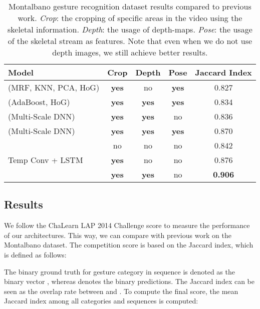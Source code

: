 \documentclass[11pt,a4paper]{article} \usepackage{a4wide}
\begin{document}
\begin{table}[bt]
\begin{center}
\begin{tabular}{lcccc}
\toprule
\multicolumn{1}{l}{\bf Model} &\multicolumn{1}{c}{\bf Crop} &\multicolumn{1}{c}{\bf Depth} &\multicolumn{1}{c}{\bf Pose} &\multicolumn{1}{c}{\bf Jaccard Index} \\ 
\midrule
\cite{chang2014nonparametric} (MRF, KNN, PCA, HoG) &\textbf{yes} &no &\textbf{yes} 	&0.827 \\
\cite{monnier2014multi} (AdaBoost, HoG) &\textbf{yes} &\textbf{yes} &\textbf{yes} 	&0.834 \\
\cite{neverova2014moddrop} (Multi-Scale DNN)  &\textbf{yes} &\textbf{yes} &no 	&0.836 \\
\cite{neverova2014moddrop} (Multi-Scale DNN)  &\textbf{yes} &\textbf{yes} &\textbf{yes} 	&0.870 \\
\midrule 
 										&no &no &no 	&0.842 \\
Temp Conv + LSTM 										&\textbf{yes} &no &no 	&0.876 \\
  										&\textbf{yes} &\textbf{yes} &no 	&\textbf{0.906} \\	
\bottomrule
\end{tabular}
\end{center}
\caption{Montalbano gesture recognition dataset results compared to previous work. \emph{Crop}: the cropping of specific areas in the video using the skeletal information. \emph{Depth}: the usage of depth-maps. \emph{Pose}: the usage of the skeletal stream as features. 
Note that even when we do not use depth images, we still achieve better results.\\}
\label{tab:sota}
\end{table}



\subsection{Results} \label{sec:results}

We follow the ChaLearn LAP 2014 Challenge score to measure the performance of our architectures. This way, we can compare with previous work on the Montalbano dataset. The competition score is based on the Jaccard index, which is defined as follows:

The binary ground truth for gesture category  in sequence  is denoted as the binary vector , whereas  denotes the binary predictions. The Jaccard index  can be seen as the overlap rate between  and . To compute the final score, the mean Jaccard index among all categories and sequences is computed:
\end{document}
